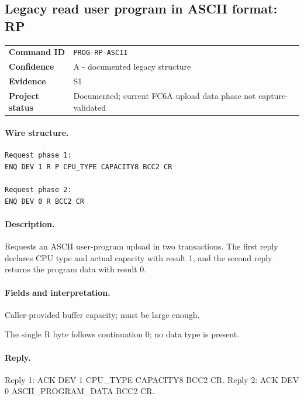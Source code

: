 \documentclass[10pt,letterpaper]{article}
\begin{document}
\subsection{Legacy read user program in ASCII format: RP}
\begin{tabularx}{\textwidth}{@{}>{\bfseries}p{2.8cm}X@{}}
Command ID & \texttt{PROG-RP-ASCII} \\
Confidence & A - documented legacy structure \\
Evidence & S1 \\
Project status & Documented; current FC6A upload data phase not capture-validated \\
\end{tabularx}
\vspace{0.35em}
\paragraph{Wire structure.}
\begin{Verbatim}[breaklines=true,breakanywhere=true,fontsize=\small]
Request phase 1:
ENQ DEV 1 R P CPU_TYPE CAPACITY8 BCC2 CR

Request phase 2:
ENQ DEV 0 R BCC2 CR
\end{Verbatim}
\paragraph{Description.} Requests an ASCII user-program upload in two transactions. The first reply declares CPU type and actual capacity with result 1, and the second reply returns the program data with result 0.
\paragraph{Fields and interpretation.}
\begin{description}[style=nextline,leftmargin=3.2cm,labelwidth=3.0cm,font=\normalfont\bfseries]
\item[CAPACITY8] Caller-provided buffer capacity; must be large enough.
\item[Phase 2 request] The single R byte follows continuation 0; no data type is present.
\end{description}
\paragraph{Reply.} Reply 1: ACK DEV 1 CPU\_TYPE CAPACITY8 BCC2 CR. Reply 2: ACK DEV 0 ASCII\_PROGRAM\_DATA BCC2 CR.
\end{document}
